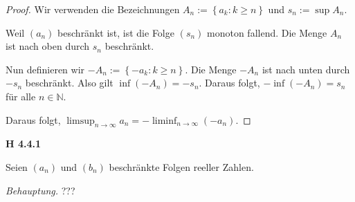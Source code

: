 \documentclass[12pt]{extarticle}
\begin{document}
\begin{proof}
  Wir verwenden die Bezeichnungen
  \(A_n:= \left\{ a_k: k \geq n \right\}\) und \(s_n:= \sup A_n\).

\vspace{3mm}

  Weil \((a_n)\) beschränkt ist, ist die Folge \((s_n)\) monoton fallend.
  Die Menge \(A_n\) ist nach oben durch \(s_n\) beschränkt.

\vspace{3mm}

  Nun definieren wir \(-A_n:= \left\{ -a_k: k \geq n \right\}\).  Die
  Menge \(-A_n\) ist nach unten durch \(-s_n\) beschränkt.  Also gilt
  \(\inf(-A_n)=-s_n\).  Daraus folgt, \(-\inf(-A_n)=s_n\) für alle
  \(n \in \mathbb{N}\).

\vspace{3mm}

  Daraus folgt,
  $\limsup_{n\rightarrow\infty}{a_n} =
  -\liminf_{n\rightarrow\infty}{(-a_n)}$.
\end{proof}

\textbf{H 4.4.1}

Seien \((a_n)\) und \((b_n)\) beschränkte Folgen reeller Zahlen.

\textit{Behauptung.}
???
\end{document}

